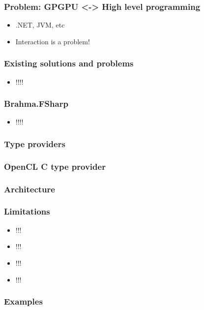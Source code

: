 \documentclass[xcolor=table]{beamer}
\begin{document}
\begin{frame}[fragile]
  \transwipe[direction=90]
  \frametitle{Problem: GPGPU <-> High level programming}
  \begin{itemize}
   \item .NET, JVM, etc
   \item Interaction is a problem!
  \end{itemize}
\end{frame}

\begin{frame}[fragile]
  \transwipe[direction=90]
  \frametitle{Existing solutions and problems}
  \begin{itemize}
  \item !!!!
  \end{itemize}
\end{frame}

\begin{frame}[fragile]
  \transwipe[direction=90]
  \frametitle{Brahma.FSharp}
  \begin{itemize}
  \item !!!!
  \end{itemize}
\end{frame}

\begin{frame}
  \transwipe[direction=90]
  \frametitle{Type providers}

\end{frame}
       

\begin{frame}
  \transwipe[direction=90]
  \frametitle{OpenCL C type provider}

\end{frame}
            
\begin{frame}
  \transwipe[direction=90]
  \frametitle{Architecture}

\end{frame}

\begin{frame}
  \transwipe[direction=90]
  \frametitle{Limitations }
  \begin{itemize}
\item !!!
\item !!!
\item !!!
\item !!!
\end{itemize}

\end{frame}

            
\begin{frame}
  \transwipe[direction=90]
  \frametitle{Examples}         
\end{frame}     
\end{document}
